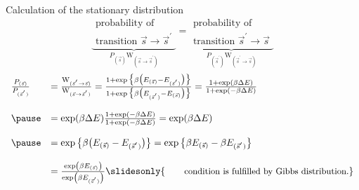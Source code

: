 \begin{frame}{Calculation of the stationary distribution}
\pause
\vspace{-0.5cm}
\begin{equation*}
	\underbrace{ \substack{	\text{probability of} \\
				\text{transition } 
				\vec{s} \rightarrow \vec{s}^{'}} }_{
			P_{(\vec{s})} \mathrm{W}_{(\vec{s} \rightarrow
				\vec{s}^{'})} }
	 = 
	\underbrace{ \substack{	\text{probability of} \\
				\text{transition } 
				\vec{s}^{'} \rightarrow \vec{s} } }_{
			P_{(\vec{s}^{'})} \mathrm{W}_{(\vec{s}^{'} \rightarrow
				\vec{s})} }
\end{equation*}
\begin{equation*}
	\begin{array}{ll}
	\frac{P_{(\vec{s})}}{P_{(\vec{s}^{'})}}
	& = \frac{\mathrm{W}_{(\vec{s}^{'} \rightarrow \vec{s})}}{
		\mathrm{W}_{(\vec{s} \rightarrow \vec{s}^{'})}} 
	= \frac{1 + \exp\big\{ \beta \big( E_{(\vec{s})} - E_{(\vec{s}^{'})}
		\big) \big\} }{1 + \exp\big\{ \beta \big( E_{(\vec{s}^{'})} - 
		E_{(\vec{s})}\big) \big\} }
	= \frac{1 + \exp( \beta \Delta E)}{1 + \exp( -\beta \Delta E)}  \\\\
	\pause
	& = \exp( \beta \Delta E) \frac{1 + \exp( -\beta \Delta E)}{
		1 + \exp( -\beta \Delta E) } 
	= \exp( \beta \Delta E ) \\\\
	\pause
	& = \exp\big\{  \beta \big( E_{(\vec{s})} - E_{(\vec{s}^{'})}\big) \big\}
	= \exp\big\{ \beta E_{(\vec{s})} -  \beta E_{(\vec{s}^{'})} \big\}\\\\
	&= \frac{\exp\left( \beta E_{(\vec{s})}\right)}{\exp\left( \beta  E_{(\vec{s}^{'})} \right)}
    \slidesonly{
    \qquad \small \text{condition is fulfilled by Gibbs distribution.}
    }
	\end{array}
\end{equation*}

\end{frame}
